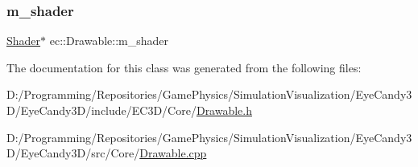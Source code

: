 \subsubsection{\texorpdfstring{m\+\_\+shader}{m\_shader}}
{\footnotesize\ttfamily \mbox{\hyperlink{classec_1_1_shader}{Shader}}$\ast$ ec\+::\+Drawable\+::m\+\_\+shader\hspace{0.3cm}{\ttfamily [protected]}}



The documentation for this class was generated from the following files\+:\begin{DoxyCompactItemize}
\item 
D\+:/\+Programming/\+Repositories/\+Game\+Physics/\+Simulation\+Visualization/\+Eye\+Candy3\+D/\+Eye\+Candy3\+D/include/\+E\+C3\+D/\+Core/\mbox{\hyperlink{_drawable_8h}{Drawable.\+h}}\item 
D\+:/\+Programming/\+Repositories/\+Game\+Physics/\+Simulation\+Visualization/\+Eye\+Candy3\+D/\+Eye\+Candy3\+D/src/\+Core/\mbox{\hyperlink{_drawable_8cpp}{Drawable.\+cpp}}\end{DoxyCompactItemize}
